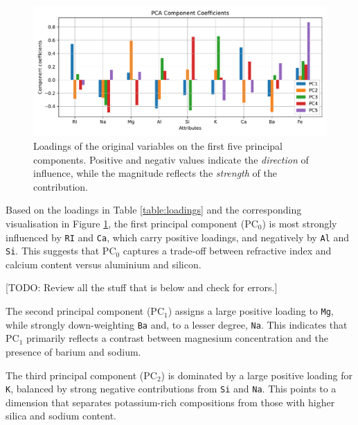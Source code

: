\documentclass[dtu]{dtuarticle}
\newcommand{\todo}[1]{\color{red}[TODO: #1]\color{black}}
\begin{document}
	\begin{figure}
		\centering
		\includegraphics[width=.99\textwidth]{figures/pca_component_coefficients}
		\caption{Loadings of the original variables on the first five principal components. Positive and negativ values indicate the \textit{direction} of influence, while the magnitude reflects the \textit{strength} of the contribution.}
		\label{fig:pc-components}
	\end{figure}

	Based on the loadings in Table \ref{table:loadings} and the corresponding visualisation in Figure \ref{fig:pc-components}, the first principal component ($\text{PC}_0$) is most strongly influenced by \texttt{RI} and \texttt{Ca}, which carry positive loadings, and negatively by \texttt{Al} and \texttt{Si}. This suggests that $\text{PC}_0$ captures a trade-off between refractive index and calcium content versus aluminium and silicon.


	\todo{Review all the stuff that is below and check for errors.}

	The second principal component ($\text{PC}_1$) assigns a large positive loading to \texttt{Mg}, while strongly down-weighting \texttt{Ba} and, to a lesser degree, \texttt{Na}. This indicates that $\text{PC}_1$ primarily reflects a contrast between magnesium concentration and the presence of barium and sodium.

	The third principal component ($\text{PC}_2$) is dominated by a large positive loading for \texttt{K}, balanced by strong negative contributions from \texttt{Si} and \texttt{Na}. This points to a dimension that separates potassium-rich compositions from those with higher silica and sodium content.
\end{document}
